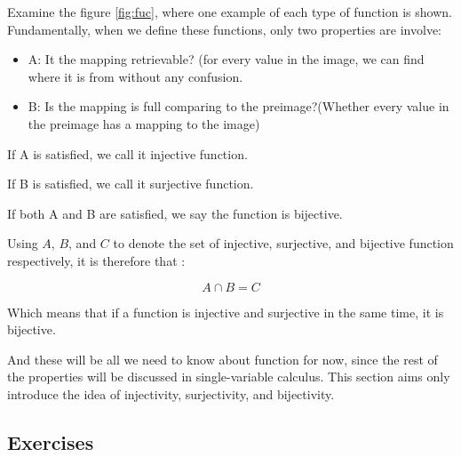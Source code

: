 Examine the figure \autoref{fig:fuc}, where one example of each type of function is shown. Fundamentally, when we define these functions, only two properties are involve:
\begin{itemize}
    \item A: It the mapping retrievable? (for every value in the image, we can find where it is from without any confusion.
    \item B: Is the mapping is full comparing to the preimage?(Whether every value in the preimage has a mapping to the image)
\end{itemize}
If A is satisfied, we call it injective function.

If B is satisfied, we call it surjective function.

If both A and B are satisfied, we say the function is bijective.

Using $A$, $B$, and $C$ to denote the set of injective, surjective, and bijective function respectively, it is therefore that :

    $$A\cap B = C$$

Which means that if a function is injective and surjective in the same time, it is bijective. 

And these will be all we need to know about function for now, since the rest of the properties will be discussed in single-variable calculus. This section aims only introduce the idea of injectivity, surjectivity, and bijectivity.

\subsection{Exercises}

